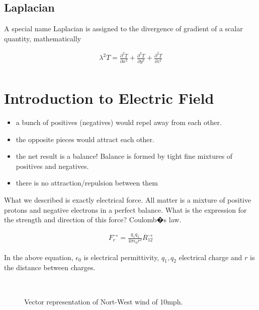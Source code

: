 \subsection{Laplacian}

A special name Laplacian is assigned to the divergence of gradient of a scalar quantity, mathematically


\begin{eqnarray}
\lambda^2 T = \frac{\partial^2 T}{\partial x^2}  +\frac{\partial^2 T}{\partial y^2} +\frac{\partial^2 T}{\partial z^2} \\ \nonumber
\end{eqnarray}


\section{Introduction to Electric Field}


\begin{itemize}
\item a bunch of positives (negatives) would repel away from each other.
\item the opposite pieces would attract each other.
\item the net result is a balance! Balance is formed by tight fine mixtures of positives and negatives.
\item there is no attraction/repulsion between them
\end{itemize}
 

What we described is exactly electrical force. All matter is a mixture of positive protons and negative electrons in a perfect balance. What is the expression for the strength and direction of this force? Coulomb�s law.

\begin{eqnarray}
F^{\to}_e=\frac{q_1 q_2}{4 \pi \epsilon_0 r^2} R^{\to}_{12}
\end{eqnarray}\label{Coulombslaw}

In the above equation, $\epsilon_0$ is electrical permittivity, $q_1,q_2$ electrical charge and $r$ is the distance between charges.


\begin{figure}[htbp]
\begin{center}
\strut{} \\
\end{center}
\caption{Vector representation of Nort-West wind of 10mph.}
\label{wind}
\end{figure}

